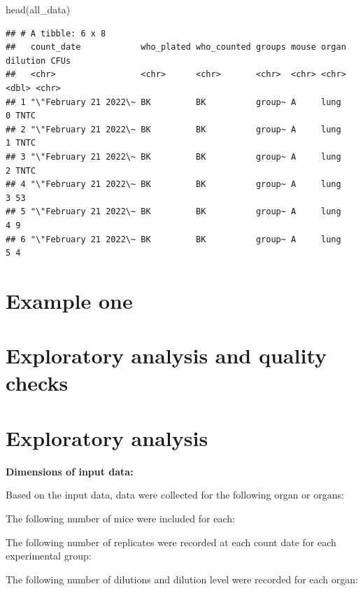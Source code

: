 \documentclass[
]{book}
\newenvironment{Shaded}{\begin{snugshade}}{\end{snugshade}}
\newcommand{\FunctionTok}[1]{\textcolor[rgb]{0.00,0.00,0.00}{#1}}
\newcommand{\NormalTok}[1]{#1}
\begin{document}
\begin{Shaded}
\begin{Highlighting}[]
\FunctionTok{head}\NormalTok{(all\_data)}
\end{Highlighting}
\end{Shaded}

\begin{verbatim}
## # A tibble: 6 x 8
##   count_date            who_plated who_counted groups mouse organ dilution CFUs 
##   <chr>                 <chr>      <chr>       <chr>  <chr> <chr>    <dbl> <chr>
## 1 "\"February 21 2022\~ BK         BK          group~ A     lung         0 TNTC 
## 2 "\"February 21 2022\~ BK         BK          group~ A     lung         1 TNTC 
## 3 "\"February 21 2022\~ BK         BK          group~ A     lung         2 TNTC 
## 4 "\"February 21 2022\~ BK         BK          group~ A     lung         3 53   
## 5 "\"February 21 2022\~ BK         BK          group~ A     lung         4 9    
## 6 "\"February 21 2022\~ BK         BK          group~ A     lung         5 4
\end{verbatim}

\hypertarget{example-one}{%
\section{Example one}\label{example-one}}

\hypertarget{exploratory-analysis-and-quality-checks}{%
\section{Exploratory analysis and quality checks}\label{exploratory-analysis-and-quality-checks}}

\hypertarget{exploratory-analysis}{%
\section{Exploratory analysis}\label{exploratory-analysis}}

\textbf{Dimensions of input data:}

Based on the input data, data were collected for the following organ or
organs:

The following number of mice were included for each:

The following number of replicates were recorded at each count date for
each experimental group:

The following number of dilutions and dilution level were recorded for
each organ:
\end{document}
